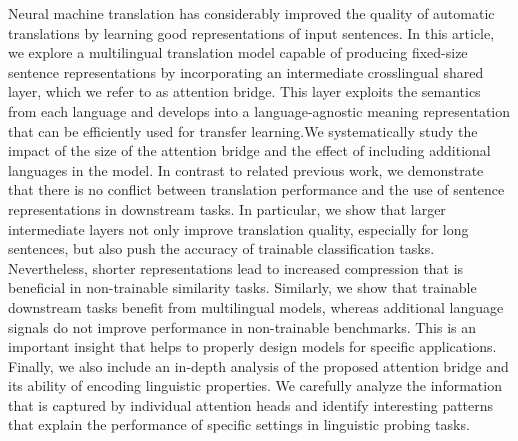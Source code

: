 Neural machine translation has considerably improved the quality of automatic translations by learning good representations of input sentences. In this article, we explore a multilingual translation model capable of producing fixed-size sentence representations by incorporating an intermediate crosslingual shared layer, which we refer to as attention bridge. This layer exploits the semantics from each language and develops into a language-agnostic meaning representation that can be efficiently used for transfer learning.We systematically study the impact of the size of the attention bridge and the effect of including additional languages in the model. In contrast to related previous work, we demonstrate that there is no conflict between translation performance and the use of sentence representations in downstream tasks. In particular, we show that larger intermediate layers not only improve translation quality, especially for long sentences, but also push the accuracy of trainable classification tasks. Nevertheless, shorter representations lead to increased compression that is beneficial in non-trainable similarity tasks. Similarly, we show that trainable downstream tasks benefit from multilingual models, whereas additional language signals do not improve performance in non-trainable benchmarks. This is an important insight that helps to properly design models for specific applications. Finally, we also include an in-depth analysis of the proposed attention bridge and its ability of encoding linguistic properties. We carefully analyze the information that is captured by individual attention heads and identify interesting patterns that explain the performance of specific settings in linguistic probing tasks.